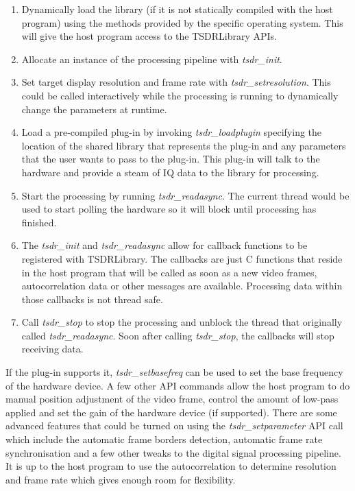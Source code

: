 \documentclass[a4paper,12pt,twoside,openright]{report}
\begin{document}
\begin{enumerate}
	\item Dynamically load the library (if it is not statically compiled with the host program) using the methods provided by the specific operating system. This will give the host program access to the TSDRLibrary APIs.
	\item Allocate an instance of the processing pipeline with \textit{tsdr\_init}.
	\item Set target display resolution and frame rate with \textit{tsdr\_setresolution}. This could be called interactively while the processing is running to dynamically change the parameters at runtime.
	\item Load a pre-compiled plug-in by invoking \textit{tsdr\_loadplugin} specifying the location of the shared library that represents the plug-in and any parameters that the user wants to pass to the plug-in. This plug-in will talk to the hardware and provide a steam of IQ data to the library for processing.
	\item Start the processing by running \textit{tsdr\_readasync}. The current thread would be used to start polling the hardware so it will block until processing has finished.
	\item The \textit{tsdr\_init} and \textit{tsdr\_readasync} allow for callback functions to be registered with TSDRLibrary. The callbacks are just C functions that reside in the host program that will be called as soon as a new video frames, autocorrelation data or other messages are available. Processing data within those callbacks is not thread safe.
	\item Call \textit{tsdr\_stop} to stop the processing and unblock the thread that originally called \textit{tsdr\_readasync}. Soon after calling \textit{tsdr\_stop}, the callbacks will stop receiving data.
\end{enumerate}

If the plug-in supports it, \textit{tsdr\_setbasefreq} can be used to set the base frequency of the hardware device. A few other API commands allow the host program to do manual position adjustment of the video frame, control the amount of low-pass applied and set the gain of the hardware device (if supported). There are some advanced features that could be turned on using the \textit{tsdr\_setparameter} API call which include the automatic frame borders detection, automatic frame rate synchronisation and a few other tweaks to the digital signal processing pipeline. It is up to the host program to use the autocorrelation to determine resolution and frame rate which gives enough room for flexibility.
\end{document}
